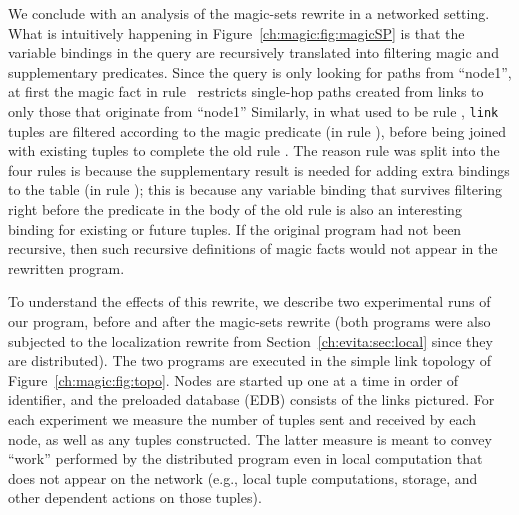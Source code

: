 We conclude with an analysis of the magic-sets rewrite in a networked setting.
What is intuitively happening in Figure~\ref{ch:magic:fig:magicSP} is that the
variable bindings in the query are recursively translated into filtering magic
and supplementary predicates.  Since the query is only looking for paths from
``node1'', at first the magic fact in rule~ restricts single-hop
paths created from links to only those that originate from ``node1'' Similarly,
in what used to be rule , {\tt link} tuples are filtered according to
the magic predicate (in rule ), before being joined with existing
 tuples to complete the old rule .  The reason rule  was
split into the four rules is because the supplementary result 
is needed for adding extra bindings to the  table (in rule
); this is because any variable binding that survives filtering
right before the  predicate in the body of the old rule  is
also an interesting binding for existing or future  tuples.  If the
original program had not been recursive, then such recursive definitions of
magic facts would not appear in the rewritten program.

To understand the effects of this rewrite, we describe two experimental runs of
our program, before and after the magic-sets rewrite (both programs were also
subjected to the localization rewrite from Section~\ref{ch:evita:sec:local}
since they are distributed).  The two programs are executed in the simple link
topology of Figure~\ref{ch:magic:fig:topo}.  Nodes are started up one at a time
in order of identifier, and the preloaded database (EDB) consists of the links
pictured.  For each experiment we measure the number of tuples sent and
received by each node, as well as any  tuples constructed.  The latter
measure is meant to convey ``work'' performed by the distributed program even
in local computation that does not appear on the network (e.g., local tuple
computations, storage, and other dependent actions on those tuples).

